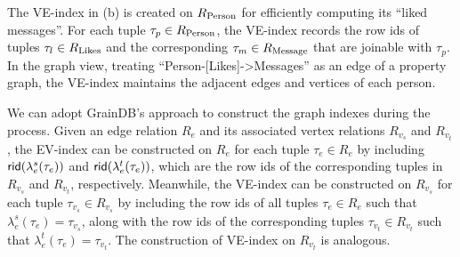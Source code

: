 The VE-index in (b) is created on ${R_{\text{Person}}}$ for efficiently computing its ``liked messages''. For each tuple $\tau_{p} \in {\ensuremath R_{\text{Person}}}$, the VE-index records the row ids of tuples $\tau_{l} \in {\ensuremath R_{\text{Likes}}}$ and the corresponding $\tau_{m} \in {\ensuremath R_{\text{Message}}}$ that are joinable with $\tau_{p}$. In the graph view, treating ``Person-[Likes]->Messages'' as an edge of a property graph, the VE-index maintains the adjacent edges and vertices of each person.

We can adopt GrainDB's approach to construct the graph indexes during the \rgmapping process. Given an edge relation $R_e$ and its associated vertex relations $R_{v_s}$ and $R_{v_t}$, the EV-index can be constructed on $R_e$ for each tuple $\tau_e \in R_e$ by including ${\mathsf{rid}}(\lambda_e^s(\tau_e))$ and ${\mathsf{rid}}(\lambda_e^t(\tau_e))$, which are the row ids of the corresponding tuples in $R_{v_s}$ and $R_{v_t}$, respectively. Meanwhile, the VE-index can be constructed on $R_{v_s}$ for each tuple $\tau_{v_s} \in R_{v_s}$ by including the row ids of all tuples $\tau_e \in R_e$ such that $\lambda_e^s(\tau_e) = \tau_{v_s}$, along with the row ids of the corresponding tuples $\tau_{v_t} \in R_{v_t}$ such that $\lambda_e^t(\tau_e) = \tau_{v_t}$.
The construction of VE-index on $R_{v_t}$ is analogous.


